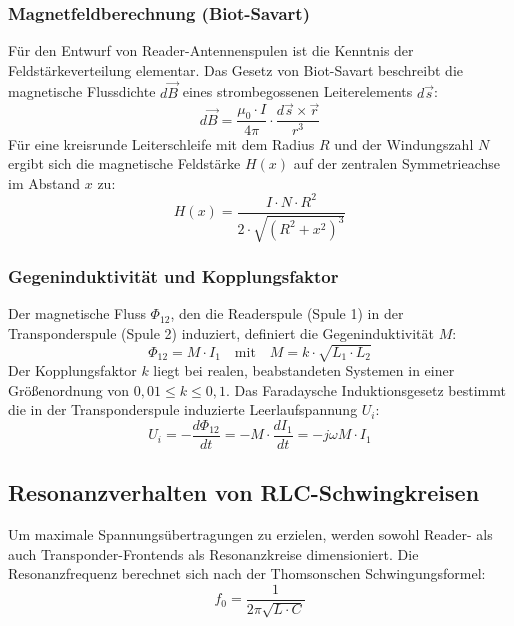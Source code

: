 \documentclass[8pt,a4paper]{article}
\begin{document}
\subsubsection{Magnetfeldberechnung (Biot-Savart)}
Für den Entwurf von Reader-Antennenspulen ist die Kenntnis der Feldstärkeverteilung elementar. Das Gesetz von Biot-Savart beschreibt die magnetische Flussdichte $d\vec{B}$ eines strombegossenen Leiterelements $d\vec{s}$:
\begin{equation}
    d\vec{B} = \frac{\mu_0 \cdot I}{4\pi} \cdot \frac{d\vec{s} \times \vec{r}}{r^3}
\end{equation}
Für eine kreisrunde Leiterschleife mit dem Radius $R$ und der Windungszahl $N$ ergibt sich die magnetische Feldstärke $H(x)$ auf der zentralen Symmetrieachse im Abstand $x$ zu:
\begin{equation}
    H(x) = \frac{I \cdot N \cdot R^2}{2 \cdot \sqrt{(R^2 + x^2)^3}}
\end{equation}

\subsubsection{Gegeninduktivität und Kopplungsfaktor}
Der magnetische Fluss $\Phi_{12}$, den die Readerspule (Spule 1) in der Transponderspule (Spule 2) induziert, definiert die Gegeninduktivität $M$:
\begin{equation}
    \Phi_{12} = M \cdot I_1 \quad \text{mit} \quad M = k \cdot \sqrt{L_1 \cdot L_2}
\end{equation}
Der Kopplungsfaktor $k$ liegt bei realen, beabstandeten Systemen in einer Größenordnung von $0{,}01 \le k \le 0{,}1$. Das Faradaysche Induktionsgesetz bestimmt die in der Transponderspule induzierte Leerlaufspannung $U_i$:
\begin{equation}
    U_i = - \frac{d\Phi_{12}}{dt} = - M \cdot \frac{dI_1}{dt} = -j\omega M \cdot I_1
\end{equation}

\subsection{Resonanzverhalten von RLC-Schwingkreisen}
Um maximale Spannungsübertragungen zu erzielen, werden sowohl Reader- als auch Transponder-Frontends als Resonanzkreise dimensioniert. Die Resonanzfrequenz berechnet sich nach der Thomsonschen Schwingungsformel:
\begin{equation}
    f_0 = \frac{1}{2\pi \sqrt{L \cdot C}}
\end{equation}
\end{document}
